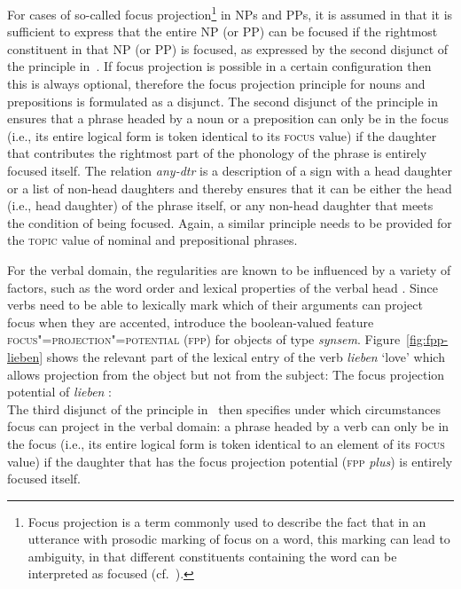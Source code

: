 \documentclass[output=paper
 	        ,biblatex
                ,babelshorthands
                ,newtxmath
                ,draftmode
                ,colorlinks, citecolor=brown
]{langscibook}
\begin{document}
For cases of so-called focus projection\footnote{Focus projection is a term commonly used to describe the fact that in an utterance with prosodic marking of focus on a word, this marking can lead to ambiguity, in that different constituents containing the word can be interpreted as focused (cf.\  \citealt{Gussenhoven83-u,Selkirk95a-u}).} in NPs and PPs, it is assumed
in \citet[169]{deKuthy2002a} that it is sufficient to express that the
entire NP (or PP) can be focused if the rightmost constituent in that
NP (or PP) is focused, as expressed by the second disjunct of the
principle in~.  If focus projection is
possible in a certain configuration then this is always optional,
therefore the focus projection principle for nouns and prepositions is
formulated as a disjunct. The second disjunct of the principle
in~ ensures that a phrase headed by a noun
or a preposition can only be in the focus (i.e., its entire logical
form is token identical to its \textsc{focus} value) if the daughter
that contributes the rightmost part of the phonology of the phrase is
entirely focused itself. The relation \textit{any-dtr} is a description of a sign with a head daughter or a list of non-head daughters and thereby
ensures that it can be either the head (i.e., head daughter) of the
phrase itself, or any non-head daughter that meets the
condition of being focused. Again, a similar principle needs to be provided for the
\textsc{topic} value of nominal and prepositional phrases.

For the verbal domain, the regularities are known to be influenced by
a variety of factors, such as the word order and lexical properties of
the verbal head \citep[cf., e.g., ][]{vSU86a}.  Since verbs
need to be able to lexically mark which of their arguments can project
focus when they are accented, \cite{dKM2003a} introduce the boolean-valued feature
\textsc{focus"=projection"=potential (fpp)} for objects of type
\textit{synsem}.  Figure~\ref{fig:fpp-lieben} shows the relevant part
of the lexical entry of the verb \textit{lieben} `love' which allows
projection from the object but not from the subject:
\ea
The focus projection potential of \textit{lieben} \citep{dKM2003a}:\\
\label{fig:fpp-lieben}
\z
The third disjunct of the principle in~ then specifies under which circumstances
focus can project in the verbal domain: a phrase headed by a verb can
only be in the focus (i.e., its entire logical form is token identical
to an element of its \textsc{focus} value) if the daughter that has the focus
projection potential (\textsc{fpp} \textit{plus}) is entirely focused
itself.
\end{document}
